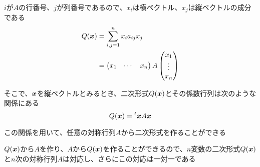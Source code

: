 \documentclass[../../../topic_linear-algebra]{subfiles}
\begin{document}
\br

$i$が$A$の行番号、$j$が列番号であるので、$x_i$は横ベクトル、$x_j$は縦ベクトルの成分である
\begin{align*}
  Q(\vb*{x}) & = \sum_{i, j=1}^n x_ia_{ij}x_j   \\
             & = \begin{pmatrix}
                   x_1 & \cdots & x_n
                 \end{pmatrix} A \begin{pmatrix}
                                   x_1    \\
                                   \vdots \\
                                   x_n
                                 \end{pmatrix}
\end{align*}

そこで、$\vb*{x}$を縦ベクトルとみるとき、二次形式$Q(\vb*{x})$とその係数行列は次のような関係にある
\begin{equation*}
  Q(\vb*{x}) = {}^t\vb*{x} A \vb*{x}
\end{equation*}

この関係を用いて、任意の対称行列$A$から二次形式を作ることができる

\br

$Q(\vb*{x})$から$A$を作り、$A$から$Q(\vb*{x})$を作ることができるので、$n$変数の二次形式$Q(\vb*{x})$と$n$次の対称行列$A$は対応し、さらにこの対応は一対一である
\end{document}
